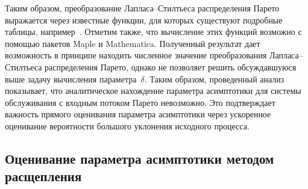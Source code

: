 \begin{multicols}{2}
Таким образом, преобразование Лапласа--Стил\-тье\-са распределения
 Парето выражается через известные функции, для которых существуют  подробные таблицы,
например~\cite{Gradshteyn&Ryzhik2000}.
Отметим \mbox{также}, что вычисление
этих функций возможно с по\-мощью  пакетов  Maple и Mathematica.
Полученный результат дает возможность  в принципе находить численное
значение преобразования Лап\-ла\-са--Стилтьеса распределения Парето,
однако не позволяет решить обсуждавшуюся выше задачу вычисления
параметра~$\delta$. Таким образом, проведенный анализ показывает,
что аналитическое на\-хож\-де\-ние параметра асимптотики для системы
обслуживания с входным потоком Парето невозможно. Это подтверждает
важность прямого оценивания параметра асимптотики через
 ускоренное оценивание вероятности большого уклонения исходного
процесса.

\subsection{Оценивание параметра асимптотики методом  расщепления}


\end{multicols}
